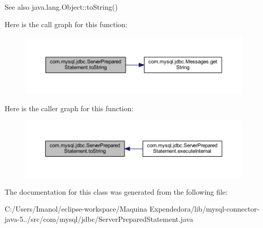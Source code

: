 \begin{DoxySeeAlso}{See also}
java.\+lang.\+Object\+::to\+String() 
\end{DoxySeeAlso}
Here is the call graph for this function\+:
\nopagebreak
\begin{figure}[H]
\begin{center}
\leavevmode
\includegraphics[width=350pt]{classcom_1_1mysql_1_1jdbc_1_1_server_prepared_statement_adbcd3a8f7f7d1d7408d97df3f1318a3d_cgraph}
\end{center}
\end{figure}
Here is the caller graph for this function\+:
\nopagebreak
\begin{figure}[H]
\begin{center}
\leavevmode
\includegraphics[width=350pt]{classcom_1_1mysql_1_1jdbc_1_1_server_prepared_statement_adbcd3a8f7f7d1d7408d97df3f1318a3d_icgraph}
\end{center}
\end{figure}


The documentation for this class was generated from the following file\+:\begin{DoxyCompactItemize}
\item 
C\+:/\+Users/\+Imanol/eclipse-\/workspace/\+Maquina Expendedora/lib/mysql-\/connector-\/java-\/5../src/com/mysql/jdbc/Server\+Prepared\+Statement.\+java\end{DoxyCompactItemize}
